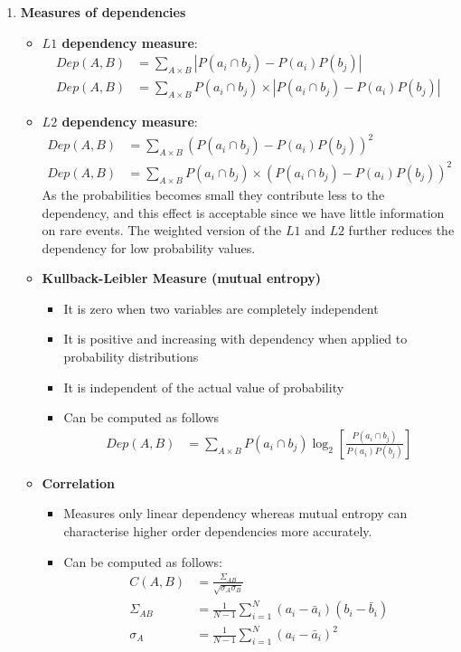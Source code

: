 \documentclass[12pt,twoside]{article}
\begin{document}
\begin{enumerate}
\item \textbf{Measures of dependencies}
\begin{itemize}
\item \textbf{$L1$ dependency measure}:
\begin{align*}
Dep (A,B) & = \sum_{A\times B} \left\vert P(a_i \cap b_j) - P(a_i)P(b_j)\right\vert \\
Dep (A,B) & = \sum_{A\times B} P(a_i \cap b_j) \times \left\vert P(a_i \cap b_j) - P(a_i)P(b_j)\right\vert 
\end{align*}
\item \textbf{$L2$ dependency measure}:
\begin{align*}
Dep (A,B) & = \sum_{A\times B} \left(P(a_i \cap b_j) - P(a_i)P(b_j)\right)^2\\
Dep (A,B) & = \sum_{A\times B} P(a_i \cap b_j) \times \left(P(a_i \cap b_j) - P(a_i)P(b_j)\right)^2
\end{align*}
As the probabilities becomes small they contribute less to the dependency, and this effect is acceptable since we have little information on rare events. 
The weighted version of the $L1$ and $L2$ further reduces the dependency for low probability values.

\item \textbf{Kullback-Leibler Measure (mutual entropy)}
\begin{itemize}
\item It is zero when two variables are completely independent
\item It is positive and increasing with dependency when applied to probability distributions
\item It is independent of the actual value of probability
\item Can be computed as follows
\begin{align*}
Dep(A,B)& = \sum_{A\times B} P(a_i \cap b_j) \log_2\left[\frac{P(a_i \cap b_j)}{P(a_i)P(b_j)}\right]
\end{align*}

\end{itemize}

\item \textbf{Correlation}
\begin{itemize}
\item Measures only linear dependency whereas mutual entropy can characterise higher order dependencies more accurately.
\item Can be computed as follows:
\begin{align*}
C(A,B) & = \frac{\Sigma_{AB}}{\sqrt{\sigma_A\sigma_B}}\\
\Sigma_{AB}& = \frac{1}{N-1}\sum_{i=1}^N (a_i -\bar{a}_i)(b_i -\bar{b}_i)\\
\sigma_A& = \frac{1}{N-1}\sum_{i=1}^N (a_i -\bar{a}_i)^2
\end{align*}
\end{itemize}
\end{itemize}

\end{enumerate}
\end{document}
